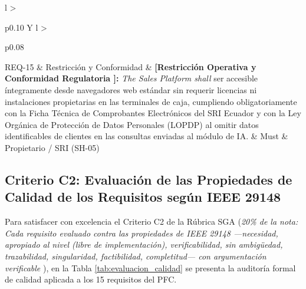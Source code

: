 \documentclass[conference,10pt]{IEEEtran}
\begin{document}
\begin{table}[htbp]
\begin{tabularx}{\textwidth}{l >{\raggedright\arraybackslash}p{} Y l >{\raggedright\arraybackslash}p{0.08\textwidth}}
			\midrule
			REQ-15 & Restricción y Conformidad & \textbf{[Restricción Operativa y Conformidad Regulatoria \cite{ieee29148, pohl2025}]:} \textit{The Sales Platform shall} ser accesible íntegramente desde navegadores web estándar sin requerir licencias ni instalaciones propietarias en las terminales de caja, cumpliendo obligatoriamente con la Ficha Técnica de Comprobantes Electrónicos del SRI Ecuador y con la Ley Orgánica de Protección de Datos Personales (LOPDP) al omitir datos identificables de clientes en las consultas enviadas al módulo de IA. & Must & Propietario / SRI (SH-05) \\
			\bottomrule
		\end{tabularx}
	\end{table}
	\subsection{Criterio C2: Evaluación de las Propiedades de Calidad de los Requisitos según IEEE 29148}
	Para satisfacer con excelencia el Criterio C2 de la Rúbrica SGA (\textit{20\% de la nota: Cada requisito evaluado contra las propiedades de IEEE 29148 —necesidad, apropiado al nivel (libre de implementación), verificabilidad, sin ambigüedad, trazabilidad, singularidad, factibilidad, completitud— con argumentación verificable} \cite{ieee29148}), en la Tabla \ref{tab:evaluacion_calidad} se presenta la auditoría formal de calidad aplicada a los 15 requisitos del PFC.
\end{document}
